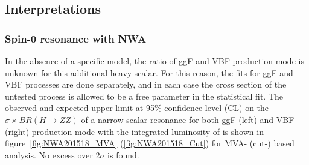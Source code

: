 %


\subsection{Interpretations}
\label{sec:hmhzz_spin0nwa}

\subsubsection{Spin-0 resonance with NWA}

In the absence of a specific model, the ratio of ggF and VBF production mode is unknown for this additional heavy scalar.
For this reason, the fits for ggF and VBF processes are done separately, and in each case the cross section of the untested process is allowed to be a free parameter in the statistical fit.
The observed and expected upper limit at 95\% confidence level (CL) on the $\sigma \times BR(H \rightarrow ZZ)$ of a narrow scalar resonance for both ggF (left) and VBF (right) production mode with the integrated luminosity of \lumi is shown in figure~\ref{fig:NWA201518_MVA} (\ref{fig:NWA201518_Cut}) for MVA- (cut-) based analysis.
No excess over 2$\sigma$ is found.

